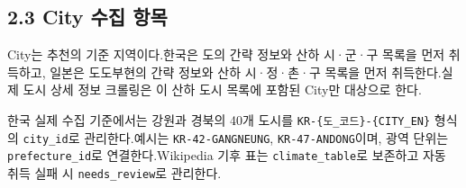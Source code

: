 \documentclass[12pt,a4paper]{article}
\newcommand{\DocNeedspace}[1]{\par\ifdim\dimexpr\pagegoal-\pagetotal\relax<#1\newpage\fi}
\begin{document}
\newpage

\DocNeedspace{24\baselineskip}
\subsection*{2.3 City 수집 항목}


\DocNeedspace{3\baselineskip}
City는 추천의 기준 지역이다.\newline 한국은 도의 간략 정보와 산하 시·군·구 목록을 먼저 취득하고, 일본은 도도부현의 간략 정보와 산하 시·정·촌·구 목록을 먼저 취득한다.\newline 실제 도시 상세 정보 크롤링은 이 산하 도시 목록에 포함된 City만 대상으로 한다.


\DocNeedspace{3\baselineskip}
한국 실제 수집 기준에서는 강원과 경북의 40개 도시를 \texttt{KR-\allowbreak{}\{\allowbreak{}도\_\allowbreak{}코드\allowbreak{}\}-\allowbreak{}\{\allowbreak{}CITY\_\allowbreak{}EN\allowbreak{}\}} 형식의 \texttt{city\_\allowbreak{}id}로 관리한다.\newline 예시는 \texttt{KR-\allowbreak{}42-\allowbreak{}GANGNEUNG}, \texttt{KR-\allowbreak{}47-\allowbreak{}ANDONG}이며, 광역 단위는 \texttt{prefecture\_\allowbreak{}id}로 연결한다.\newline Wikipedia 기후 표는 \texttt{climate\_\allowbreak{}table}로 보존하고 자동 취득 실패 시 \texttt{needs\_\allowbreak{}review}로 관리한다.
\end{document}
